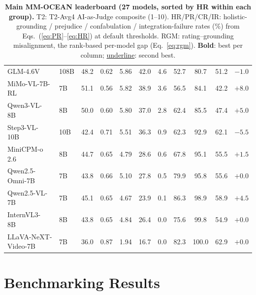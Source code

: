 \documentclass{llmxive}
\providecommand{\benchname}{MM-OCEAN}
\providecommand{\best}[1]{\textbf{#1}}
\providecommand{\second}[1]{\underline{#1}}
\begin{document}
\begin{table}[t]
{\begin{tabular}{l@{\hspace{0.4em}}l@{\hspace{1.0em}}cccc@{\hspace{1.0em}}cccc@{\hspace{1.0em}}c}
GLM-4.6V~\cite{hong2025glm}                & 108B & 48.2 & 0.62 & 5.86 & 42.0 &  4.6 & 52.7          & 80.7          & 51.2        & $-1.0$  \\
MiMo-VL-7B-RL~\cite{li2025mimo}        & 7B   & 51.1 & 0.56 & 5.82 & 38.9 &  3.6 & 56.5          & 84.1          & 42.2        & $+8.0$  \\
Qwen3-VL-8B~\cite{bai2025qwen25vl}          & 8B   & 50.0 & 0.60 & 5.80 & 37.0 &  2.8 & 62.4          & 85.5          & 47.4        & $+5.0$  \\
Step3-VL-10B~\cite{huang2026step3vl}         & 10B  & 42.4 & 0.71 & 5.51 & 36.3 &  0.9 & 62.3          & 92.9          & 62.1        & $-5.5$  \\
MiniCPM-o 2.6~\cite{yao2024minicpmv}        & 8B   & 44.7 & 0.65 & 4.79 & 28.6 &  0.6 & 67.8          & 95.1          & 55.5        & $+1.5$  \\
Qwen2.5-Omni-7B~\cite{xu2025qwen3}          & 7B   & 43.8 & 0.66 & 5.10 & 27.8 &  0.5 & 79.9          & 95.8          & 55.6        & $+0.0$  \\
Qwen2.5-VL-7B~\cite{bai2025qwen25vl}        & 7B   & 45.1 & 0.65 & 4.67 & 23.9 &  0.1 & 86.3          & 98.9          & 58.9        & $+4.5$  \\
InternVL3-8B~\cite{chen2024internvl}         & 8B   & 43.8 & 0.65 & 4.84 & 26.4 &  0.0 & 75.6          & 99.8          & 54.9        & $+0.0$  \\
LLaVA-NeXT-Video-7B~\cite{liu2024llava15}  & 7B   & 36.0 & 0.87 & 1.94 & 16.7 &  0.0 & 82.3          & 100.0         & 62.9        & $+0.0$  \\
\bottomrule
\end{tabular}%
}
\vspace{-0.5cm}
\caption{\textbf{Main \benchname{} leaderboard (27 models, sorted by HR within each group).} T2: T2-Avg4 AI-as-Judge composite (1--10). HR/PR/CR/IR: holistic-grounding / prejudice / confabulation / integration-failure rates (\%) from Eqs.~(\ref{eq:PR}--\ref{eq:HR}) at default thresholds. RGM: rating--grounding misalignment, the rank-based per-model gap (Eq.~\ref{eq:rgm}). \best{Bold}: best per column; \second{underline}: second best.}
\end{table}

\vspace{-0.2cm}
\section{Benchmarking Results}
\label{sec:exp}
\end{document}

